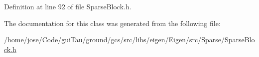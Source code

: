 Definition at line 92 of file Sparse\-Block.\-h.



The documentation for this class was generated from the following file\-:\begin{DoxyCompactItemize}
\item 
/home/jose/\-Code/gui\-Tau/ground/gcs/src/libs/eigen/\-Eigen/src/\-Sparse/\hyperlink{_sparse_block_8h}{Sparse\-Block.\-h}\end{DoxyCompactItemize}
